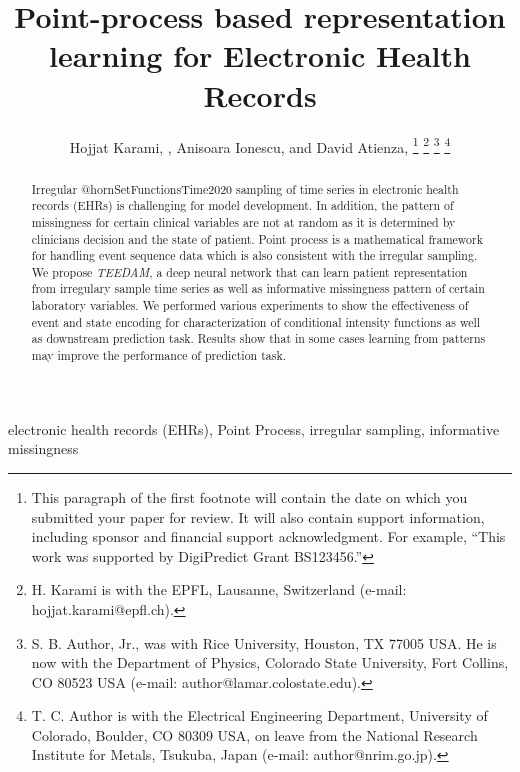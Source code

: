 \documentclass[journal,twoside,web]{ieeecolor}
\begin{document}
\title{Point-process based representation learning for Electronic Health Records}
\author{Hojjat Karami, , Anisoara Ionescu, and David Atienza, 
\thanks{This paragraph of the first footnote will contain the date on 
which you submitted your paper for review. It will also contain support 
information, including sponsor and financial support acknowledgment. For 
example, ``This work was supported by DigiPredict Grant BS123456.'' }
\thanks{H. Karami is with the EPFL, Lausanne, Switzerland (e-mail: hojjat.karami@epfl.ch). }
\thanks{S. B. Author, Jr., was with Rice University, Houston, TX 77005 USA. He is 
now with the Department of Physics, Colorado State University, Fort Collins, 
CO 80523 USA (e-mail: author@lamar.colostate.edu).}
\thanks{T. C. Author is with 
the Electrical Engineering Department, University of Colorado, Boulder, CO 
80309 USA, on leave from the National Research Institute for Metals, 
Tsukuba, Japan (e-mail: author@nrim.go.jp).}}

\maketitle


\begin{abstract}

    Irregular @hornSetFunctionsTime2020 sampling of time series in electronic health records (EHRs) is challenging for model development. In addition, the pattern of missingness for certain clinical variables are not at random as it is determined by clinicians decision and the state of patient. Point process is a mathematical framework for handling event sequence data which is also consistent with the irregular sampling. We propose \emph{TEEDAM}, a deep neural network that can learn patient representation from irregulary sample time series as well as informative missingness pattern of certain laboratory variables. We performed various experiments to show the effectiveness of event and state encoding for characterization of conditional intensity functions as well as downstream prediction task. Results show that in some cases learning from patterns may improve the performance of prediction task.
\end{abstract}

\begin{IEEEkeywords}
    electronic health records (EHRs), Point Process, irregular sampling, informative missingness
\end{IEEEkeywords}
\end{document}
